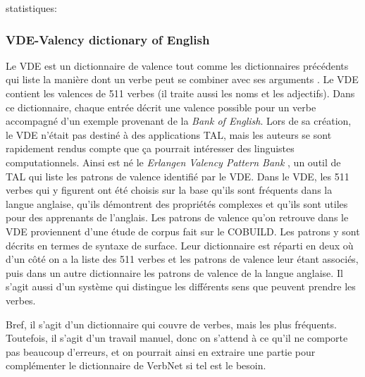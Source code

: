 statistiques:

\subsubsection{VDE-Valency dictionary of English}
Le VDE est un dictionnaire de valence tout comme les dictionnaires précédents qui liste la manière dont un verbe peut se combiner avec ses arguments \citep{HerbstValencyDictionaryEnglish2004}. Le VDE contient les valences de 511 verbes (il traite aussi les noms et les adjectifs). Dans ce dictionnaire, chaque entrée décrit une valence possible pour un verbe accompagné d'un exemple provenant de la \emph{Bank of English}. Lors de sa création, le VDE n'était pas destiné à des applications TAL, mais les auteurs se sont rapidement rendus compte que ça pourrait intéresser des linguistes computationnels. Ainsi est né le \emph{Erlangen Valency Pattern Bank} \citep{faucris.1039365}, un outil de TAL qui liste les patrons de valence identifié par le VDE.  Dans le VDE, les 511 verbes qui y figurent ont été choisis sur la base qu'ils sont fréquents dans la langue anglaise, qu'ils démontrent des propriétés complexes et qu'ils sont utiles pour des apprenants de l'anglais. Les patrons de valence qu'on retrouve dans le VDE proviennent d'une étude de corpus fait sur le COBUILD. Les patrons y sont décrits en termes de syntaxe de surface.  Leur dictionnaire est réparti en deux où d'un côté on a la liste des 511 verbes et les patrons de valence leur étant associés, puis dans un autre dictionnaire les patrons de valence de la langue anglaise. Il s'agit aussi d'un système qui distingue les différents sens que peuvent prendre les verbes. 

Bref, il s'agit d'un dictionnaire qui couvre de verbes, mais les plus fréquents. Toutefois, il s'agit d'un travail manuel, donc on s'attend à ce qu'il ne comporte pas beaucoup d'erreurs, et on pourrait ainsi en extraire une partie pour complémenter le dictionnaire de VerbNet si tel est le besoin.


